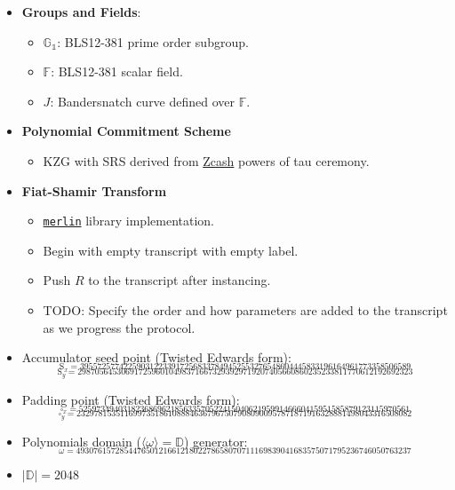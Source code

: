 \documentclass[
]{article}
\providecommand{\tightlist}{%
  \setlength{\itemsep}{0pt}\setlength{\parskip}{0pt}}
\begin{document}
\begin{itemize}
\item
  \textbf{Groups and Fields}:

  \begin{itemize}
  \tightlist
  \item
    \(\mathbb{G_1}\): BLS12-381 prime order subgroup.
  \item
    \(\mathbb{F}\): BLS12-381 scalar field.
  \item
    \(J\): Bandersnatch curve defined over \(\mathbb{F}\).
  \end{itemize}
\item
  \textbf{Polynomial Commitment Scheme}

  \begin{itemize}
  \tightlist
  \item
    KZG with SRS derived from
    \href{https://zfnd.org/conclusion-of-the-powers-of-tau-ceremony}{Zcash}
    powers of tau ceremony.
  \end{itemize}
\item
  \textbf{Fiat-Shamir Transform}

  \begin{itemize}
  \tightlist
  \item
    \href{https://merlin.cool}{\texttt{merlin}} library implementation.
  \item
    Begin with empty transcript with empty label.
  \item
    Push \(R\) to the transcript after instancing.
  \item
    TODO: Specify the order and how parameters are added to the
    transcript as we progress the protocol.
  \end{itemize}
\item
  Accumulator seed point (Twisted Edwards form):
  \[_{\text{S}_x = 3955725774225903122339172568337849452553276548604445833196164961773358506589}\]
  \[_{\text{S}_y = 29870564530691725960104983716673293929719207405660860235233811770612192692323}\]
\item
  Padding point (Twisted Edwards form):
  \[_{\square_x = 5259734940318236869621856335705224150406219599146660415951585879123115970561}\]
  \[_{\square_y = 23297815351169973518610888463679675079080900957871871916328881498043316508082}\]
\item
  Polynomials domain (\(\langle \omega \rangle = \mathbb{D}\))
  generator:
  \[_{\omega = 49307615728544765012166121802278658070711169839041683575071795236746050763237}\]
\item
  \(|\mathbb{D}| = 2048\)
\end{itemize}
\end{document}
